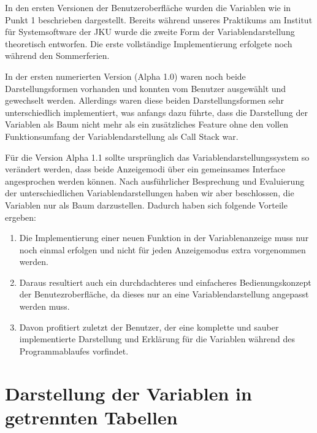 In den ersten Versionen der Benutzeroberfläche wurden die Variablen wie in Punkt 1 beschrieben dargestellt. Bereits während unseres Praktikums am Institut für Systemsoftware der JKU wurde die zweite Form der Variablendarstellung theoretisch entworfen. Die erste vollständige Implementierung erfolgete noch während den Sommerferien.
\newline

In der ersten numerierten Version (Alpha 1.0) waren noch beide Darstellungsformen vorhanden und konnten vom Benutzer ausgewählt und gewechselt werden. Allerdings waren diese beiden Darstellungsformen sehr unterschiedlich implementiert, was anfangs dazu führte, dass die Darstellung der Variablen als Baum nicht mehr als ein zusätzliches Feature ohne den vollen Funktionsumfang der Variablendarstellung als Call Stack war.
\newline

Für die Version Alpha 1.1 sollte ursprünglich das Variablendarstellungssystem so verändert werden, dass beide Anzeigemodi über ein gemeinsames Interface angesprochen werden können. Nach ausführlicher Besprechung und Evaluierung der unterschiedlichen Variablendarstellungen haben wir aber beschlossen, die Variablen nur als Baum darzustellen. Dadurch haben sich folgende Vorteile ergeben:
\begin{enumerate}
\item Die Implementierung einer neuen Funktion in der Variablenanzeige muss nur noch einmal erfolgen und nicht für jeden Anzeigemodus extra vorgenommen werden.
\item Daraus resultiert auch ein durchdachteres und einfacheres Bedienungskonzept der Benutezroberfläche, da dieses nur an eine Variablendarstellung angepasst werden muss.
\item Davon profitiert zuletzt der Benutzer, der eine komplette und sauber implementierte Darstellung und Erklärung für die Variablen während des Programmablaufes vorfindet.
\end{enumerate}

\section{Darstellung der Variablen in getrennten Tabellen}

